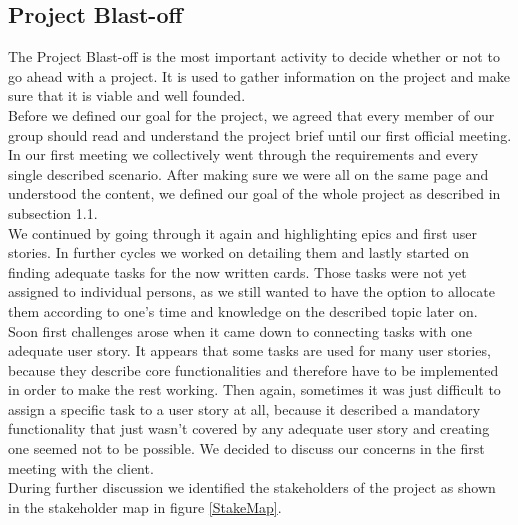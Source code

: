 \subsection{Project Blast-off}

The Project Blast-off is the most important activity to decide whether or not to go ahead with a project. It is used to gather information on the project and make sure that it is viable and well founded. \\ 
Before we defined our goal for the project, we agreed that every member of our group should read and understand the project brief until our first official meeting. In our first meeting we collectively went through the requirements and every single described scenario. After making sure we were all on the same page and understood the content, we defined our goal of the whole project as described in subsection 1.1. \\ 
We continued by going through it again and highlighting epics and first user stories. In further cycles we worked on detailing them and lastly started on finding adequate tasks for the now written cards. Those tasks were not yet assigned to individual persons, as we still wanted to have the option to allocate them according to one’s time and knowledge on the described topic later on. Soon first challenges arose when it came down to connecting tasks with one adequate user story. It appears that some tasks are used for many user stories, because they describe core functionalities and therefore have to be implemented in order to make the rest working. Then again, sometimes it was just difficult to assign a specific task to a user story at all, because it described a mandatory functionality that just wasn’t covered by any adequate user story and creating one seemed not to be possible. We decided to discuss our concerns in the first meeting with the client.\\ 
During further discussion we identified the stakeholders of the project as shown in the stakeholder map in figure \ref{StakeMap}. \\ 

\newpage

